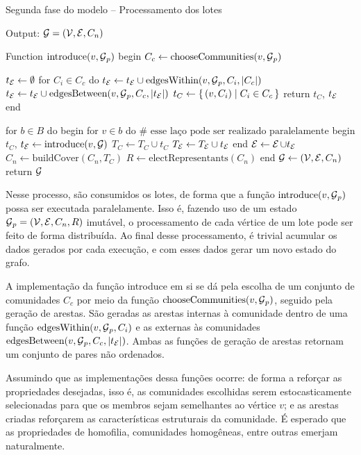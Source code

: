 \documentclass[notes.tex]{subfiles}
\begin{document}
\begin{quadro}[htbp]
\caption{Segunda fase do modelo -- Processamento dos lotes}
\label{qua:fase_2_2}
\begin{algorithm}
Output: $\operatorname{\mathcal{G}} = (\operatorname{\mathcal{V}}, \operatorname{\mathcal{E}}, C_n)$

Function $\text{introduce}(v, \operatorname{\mathcal{G}}_p)$
begin
    $C_c \leftarrow \text{chooseCommunities}(v, \operatorname{\mathcal{G}}_p)$

    $t_{\operatorname{\mathcal{E}}}\leftarrow \emptyset$
    for $C_i \in C_c$ do $t_{\operatorname{\mathcal{E}}}\leftarrow t_{\operatorname{\mathcal{E}}}\cup\text{edgesWithin}(v, \operatorname{\mathcal{G}}_p, C_i, |C_c|)$
    $t_{\operatorname{\mathcal{E}}}\leftarrow t_{\operatorname{\mathcal{E}}}\cup\text{edgesBetween}(v, \operatorname{\mathcal{G}}_p, C_c, |t_{\operatorname{\mathcal{E}}}|)$
    $t_C \leftarrow \set{(v, C_i) | C_i \in C_c}$
    return $t_C$,  $t_{\operatorname{\mathcal{E}}}$
end

for $b \in B$ do
begin
    for $v \in b$ do #  $\text{esse laço pode ser realizado paralelamente}$
    begin
        $t_C$, $t_{\operatorname{\mathcal{E}}}\leftarrow \text{introduce}(v, \operatorname{\mathcal{G}})$
        $T_C \leftarrow T_C \cup t_C$
        $T_{\operatorname{\mathcal{E}}}\leftarrow T_{\operatorname{\mathcal{E}}}\cup t_{\operatorname{\mathcal{E}}}$
    end
    $\operatorname{\mathcal{E}} \leftarrow \operatorname{\mathcal{E}} \cup t_{\operatorname{\mathcal{E}}}$
    $C_n \leftarrow \text{buildCover}(C_n, T_C)$
    $R \leftarrow \text{electRepresentants}(C_n)$
end
$\operatorname{\mathcal{G}} \leftarrow (\operatorname{\mathcal{V}}, \operatorname{\mathcal{E}}, C_n)$ 
return $\operatorname{\mathcal{G}}$
\end{algorithm}
\end{quadro}

Nesse processo, são consumidos os lotes, de forma que a função $\text{introduce}(v, \operatorname{\mathcal{G}}_p)$ possa ser executada paralelamente.
Isso é, fazendo uso de um estado $\operatorname{\mathcal{G}}_p = (\operatorname{\mathcal{V}}, \operatorname{\mathcal{E}}, C_n, R)$ imutável, o processamento de cada vértice de um lote pode ser feito de forma distribuída.
Ao final desse processamento, é trivial acumular os dados gerados por cada execução, e com esses dados gerar um novo estado do grafo.

A implementação da função introduce em si se dá pela escolha de um conjunto de comunidades $C_c$ por meio da função $\text{chooseCommunities}(v, \operatorname{\mathcal{G}}_p)$, seguido pela geração de arestas.
São geradas as arestas internas à comunidade dentro de uma função $\text{edgesWithin}(v, \operatorname{\mathcal{G}}_p, C_i)$ e as externas às comunidades $\text{edgesBetween}(v, \operatorname{\mathcal{G}}_p, C_c, |t_{\operatorname{\mathcal{E}}}|)$.
Ambas as funções de geração de arestas retornam um conjunto de pares não ordenados.

Assumindo que as implementações dessa funções ocorre: de forma a reforçar as propriedades desejadas, isso é,
as comunidades escolhidas serem estocasticamente selecionadas para que os membros sejam semelhantes ao vértice $v$;
e as arestas criadas reforçarem as características estruturais da comunidade.
É esperado que as propriedades de homofilia, comunidades homogêneas, entre outras emerjam naturalmente.
\end{document}
